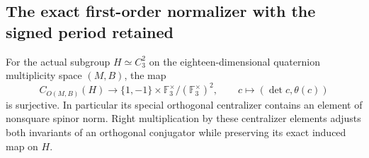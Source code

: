 \subsection{The exact first-order normalizer with the signed period retained}

\begin{lemma}
\label{lem:orthogonal-centralizer-spinor}
For the actual subgroup \(H\simeq C_3^2\) on the eighteen-dimensional
quaternion multiplicity space \((M,B)\), the map
\[
 C_{O(M,B)}(H)\longrightarrow
 \{1,-1\}\times\mathbb F_3^\times/(\mathbb F_3^\times)^2,
 \qquad c\longmapsto(\det c,\theta(c))
 \tag{NJ.1}
\]
is surjective. In particular its special orthogonal centralizer contains
an element of nonsquare spinor norm. Right multiplication by these
centralizer elements adjusts both invariants of an orthogonal conjugator
while preserving its exact induced map on \(H\).
\end{lemma}
